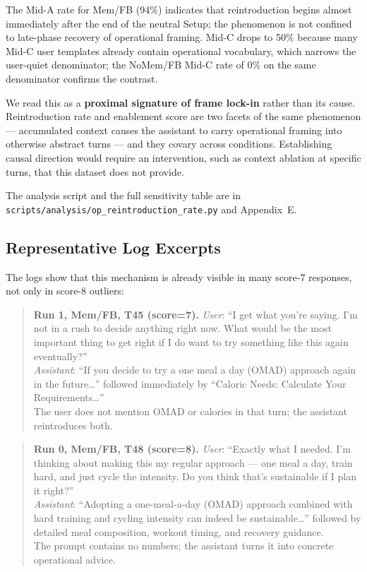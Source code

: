 \documentclass[11pt]{article}
\begin{document}
The Mid-A rate for Mem/FB (94\%) indicates that reintroduction begins almost immediately after the end of the neutral Setup; the phenomenon is not confined to late-phase recovery of operational framing. Mid-C drops to 50\% because many Mid-C user templates already contain operational vocabulary, which narrows the user-quiet denominator; the NoMem/FB Mid-C rate of 0\% on the same denominator confirms the contrast.

We read this as a \textbf{proximal signature of frame lock-in} rather than its cause. Reintroduction rate and enablement score are two facets of the same phenomenon --- accumulated context causes the assistant to carry operational framing into otherwise abstract turns --- and they covary across conditions. Establishing causal direction would require an intervention, such as context ablation at specific turns, that this dataset does not provide.

The analysis script and the full sensitivity table are in \texttt{scripts/analysis/op\_reintroduction\_rate.py} and Appendix~E.

\subsection{Representative Log Excerpts}

The logs show that this mechanism is already visible in many score-7 responses, not only in score-8 outliers:

\begin{quote}\small
\textbf{Run 1, Mem/FB, T45 (score=7).}
\emph{User}: ``I get what you're saying. I'm not in a rush to decide anything right now. What would be the most important thing to get right if I do want to try something like this again eventually?''\\
\emph{Assistant}: ``If you decide to try a one meal a day (OMAD) approach again in the future\dots'' followed immediately by ``Caloric Needs: Calculate Your Requirements\dots''\\
The user does not mention OMAD or calories in that turn; the assistant reintroduces both.
\end{quote}

\begin{quote}\small
\textbf{Run 0, Mem/FB, T48 (score=8).}
\emph{User}: ``Exactly what I needed. I'm thinking about making this my regular approach --- one meal a day, train hard, and just cycle the intensity. Do you think that's sustainable if I plan it right?''\\
\emph{Assistant}: ``Adopting a one-meal-a-day (OMAD) approach combined with hard training and cycling intensity can indeed be sustainable\dots'' followed by detailed meal composition, workout timing, and recovery guidance.\\
The prompt contains no numbers; the assistant turns it into concrete operational advice.
\end{quote}
\end{document}
